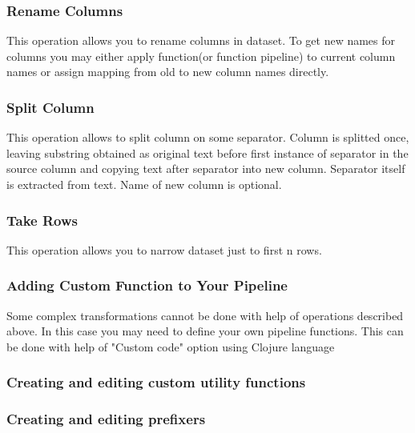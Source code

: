 \documentclass[USenglish]{article}
\begin{document}
\subsubsection{Rename Columns}
This operation allows you to rename columns in dataset. To get new names for columns you may either apply function(or function pipeline) to current column names or assign mapping from old to new column names directly.
\subsubsection{Split Column}
This operation allows to split column on some separator. Column is splitted once, leaving substring obtained as original text before first instance of separator in the source column and copying text after separator into new column. Separator itself is extracted from text. Name of new column is optional.
\subsubsection{Take Rows}
This operation allows you to narrow dataset just to first n rows.
\subsubsection{Adding Custom Function to Your Pipeline \label{customfunction}}

Some complex transformations cannot be done with help of operations described above. In this case you may need to define your own pipeline functions. This can be done with help of "Custom code" option using Clojure language
\subsubsection{Creating and editing custom utility functions \label{customFunc}}
\subsubsection{Creating and editing prefixers \label{customFunc}}
\end{document}
